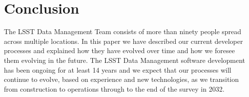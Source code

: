 \section{Conclusion}

The LSST Data Management Team consists of more than ninety people spread across multiple locations.
In this paper we have described our current developer processes and explained how they have evolved over time and how we foresee them evolving in the future.
The LSST Data Management software development has been ongoing for at least 14 years and we expect that our processes will continue to evolve, based on experience and new technologies, as we transition from construction to operations through to the end of the survey in 2032.
